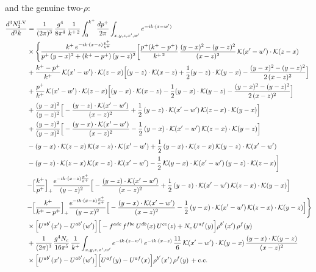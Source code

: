 \documentclass[9pt]{article}
\numberwithin{equation}{section}
\begin{document}
and the genuine two-$\rho$:
\begin{align}
\frac{d^{3}N^{\rm I.V}_{2}}{d^{3}k} & =\frac{1}{(2\pi)^{3}}\,\frac{g^{4}}{8\pi^{4}}\,\frac{1}{k^{+\,2}}\int_{0}^{k^{+}}\frac{dp^{+}}{2\pi}\int_{x,y,z,x',w'}e^{-ik\cdot{(z-w')}}\notag\\
&\times\Bigg\{\frac{k^{+}\,e^{-ik\cdot{(x-z)}\frac{p^{+}}{k^{+}}}}{p^{+}\,(y-x)^{2}+(k^{+}-p^{+})\,(y-z)^{2}}\bigg[\frac{p^{+}(k^{+}-p^{+})}{k^{+\,2}}\,\frac{(y-x)^{2}-(y-z)^{2}}{(x-z)^{2}}\,\mathcal{K}(x'-w')\cdot\mathcal{K}(z-x)\notag\\
&+\frac{k^{+}-p^{+}}{k^{+}}\,\mathcal{K}(x'-w')\cdot\mathcal{K}(z-x)\Big[(y-z)\cdot\mathcal{K}(x-z)+\frac{1}{2}(y-z)\cdot\mathcal{K}(y-x)-\frac{(y-x)^{2}-(y-z)^{2}}{2\,(x-z)^{2}}\Big]\notag\\
&+\frac{p^{+}}{k^{+}}\,\mathcal{K}(x'-w')\cdot\mathcal{K}(z-x)\Big[(y-x)\cdot\mathcal{K}(x-z)-\frac{1}{2}(y-x)\cdot\mathcal{K}(y-z)-\frac{(y-x)^{2}-(y-z)^{2}}{2\,(x-z)^{2}}\Big]\notag\\
&+\frac{(y-x)^{2}}{(y-z)^{2}}\Big[-\frac{(y-z)\cdot\mathcal{K}(x'-w')}{(x-z)^{2}}+\frac{1}{2}\,(y-z)\cdot\mathcal{K}(x'-w')\,\mathcal{K}(z-x)\cdot\mathcal{K}(y-x)\Big]\notag\\
&+\frac{(y-z)^{2}}{(y-x)^{2}}\Big[-\frac{(y-x)\cdot\mathcal{K}(x'-w')}{(x-z)^{2}}-\frac{1}{2}\,(y-x)\cdot\mathcal{K}(x'-w')\,\mathcal{K}(z-x)\cdot\mathcal{K}(y-z)\Big]\notag\\
&-(y-x)\cdot\mathcal{K}(z-x)\,\mathcal{K}(x-z)\cdot\mathcal{K}(x'-w')+\frac{1}{2}\,(y-x)\cdot\mathcal{K}(z-x)\,\mathcal{K}(y-z)\cdot\mathcal{K}(x'-w')\notag\\
&-(y-z)\cdot\mathcal{K}(z-x)\,\mathcal{K}(x-z)\cdot\mathcal{K}(x'-w')-\frac{1}{2}\,\mathcal{K}(y-x)\cdot\mathcal{K}(x'-w')\,(y-z)\cdot\mathcal{K}(z-x)\bigg]\notag\\
&{-\Big[\frac{k^{+}}{p^{+}}\Big]_{+}\frac{e^{-ik\cdot{(x-z)}\frac{p^{+}}{k^{+}}}}{(y-z)^{2}}\Big[-\frac{(y-z)\cdot\mathcal{K}(x'-w')}{(x-z)^{2}}+\frac{1}{2}\,(y-z)\cdot\mathcal{K}(x'-w')\,\mathcal{K}(z-x)\cdot\mathcal{K}(y-x)\Big]}\notag\\
&{-\Big[\frac{k^{+}}{k^{+}-p^{+}}\Big]_{+}\frac{e^{-ik\cdot{(x-z)}\frac{p^{+}}{k^{+}}}}{(y-x)^{2}}\Big[-\frac{(y-x)\cdot\mathcal{K}(x'-w')}{(x-z)^{2}}-\frac{1}{2}\,(y-x)\cdot\mathcal{K}(x'-w')\,\mathcal{K}(z-x)\cdot\mathcal{K}(y-z)\Big]}\Bigg\}\notag\\
&\times\Big[U^{ab'}(x')-U^{ab'}(w')\Big]\Big[-f^{adc}\,f^{fbe}\,U^{db}(x)\,U^{ce}(z)+N_{c}\,U^{af}(y)\Big]\rho^{b'}(x')\,\rho^{f}(y)\notag\\
&+\frac{1}{(2\pi)^{3}}\,\frac{g^{4}N_{c}}{16\pi^{5}}\,\frac{1}{k^{+}}\int_{x,y,z,x',w'}e^{-ik\cdot{(z-w')}}\,e^{-ik\cdot{(x-z)}}\,\frac{11}{6}\,\mathcal{K}(x'-w')\cdot\mathcal{K}(y-x)\,\frac{(y-x)\cdot\mathcal{K}(y-z)}{(x-z)^{2}}\notag\\
&\times\Big[U^{ab'}(x')-U^{ab'}(w')\Big]\Big[U^{af}(y)-U^{af}(x)\Big]\rho^{b'}(x')\,\rho^{f}(y)\,+ {\rm c.c.}
\label{eq:D-I.V-2o}
\end{align}
\end{document}
